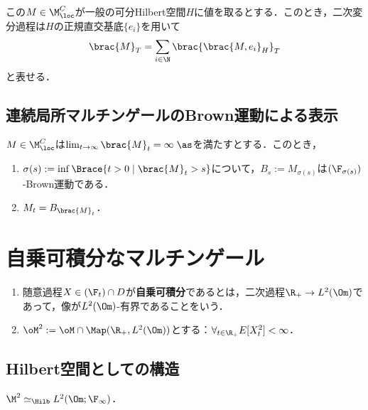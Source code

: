 \documentclass[uplatex,dvipdfmx]{jsreport}
\begin{document}
\begin{theorem}
    この$M\in\M_\loc^C$が一般の可分Hilbert空間$H$に値を取るとする．このとき，二次変分過程は$H$の正規直交基底$\{e_i\}$を用いて
    \[\brac{M}_T=\sum_{i\in\N}\brac{\brac{M,e_i}_H}_T\]
    と表せる．
\end{theorem}

\subsection{連続局所マルチンゲールのBrown運動による表示}

\begin{theorem}
    $M\in\M^C_\loc$は$\lim_{t\to\infty}\brac{M}_t=\infty\;\as$を満たすとする．このとき，
    \begin{enumerate}
        \item $\sigma(s):=\inf\Brace{t>0\mid\brac{M}_t>s}$について，$B_s:=M_{\sigma(s)}$は$(\F_{\sigma(s)})$-Brown運動である．
        \item $M_t=B_{\brac{M}_t}$．
    \end{enumerate}
\end{theorem}

\section{自乗可積分なマルチンゲール}

\begin{definition}\mbox{}
    \begin{enumerate}
        \item 随意過程$X\in(\F_t)\cap D$が\textbf{自乗可積分}であるとは，二次過程$\R_+\to L^2(\Om)$であって，像が$L^2(\Om)$-有界であることをいう．
        \item $\oM^2:=\oM\cap\Map(\R_+,L^2(\Om))$とする：$\forall_{t\in\R_+}E[X_t^2]<\infty$．
    \end{enumerate}
\end{definition}

\subsection{Hilbert空間としての構造}

\begin{tcolorbox}[colframe=ForestGreen, colback=ForestGreen!10!white,breakable,colbacktitle=ForestGreen!40!white,coltitle=black,fonttitle=\bfseries\sffamily,
title=]
    $\M^2\simeq_\Hilb L^2(\Om;\F_\infty)$．
\end{tcolorbox}
\end{document}
